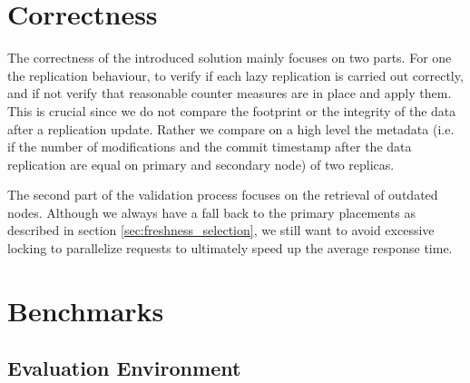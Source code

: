 \section{Correctness}

The correctness of the introduced solution mainly focuses on two parts. For one the replication behaviour, to verify if each lazy replication is carried out correctly,
and if not verify that reasonable counter measures are in place and apply them. This is crucial since we do not compare the footprint or the integrity of the data after 
a replication update. Rather we compare on a high level the metadata 
(i.e. if the number of modifications and the commit timestamp after the data replication are equal on primary and secondary node) of two replicas. 

The second part of the validation process focuses on the retrieval of outdated nodes. Although we always have a fall back to the primary placements as described in section \ref{sec:freshness_selection},
we still want to avoid excessive locking to parallelize requests to ultimately speed up the average response time.


\todoMissing{\ref{sec:constraints, lazy -> eager and outdated -> refreshable}}



\section{Benchmarks}



\subsection{Evaluation Environment}


